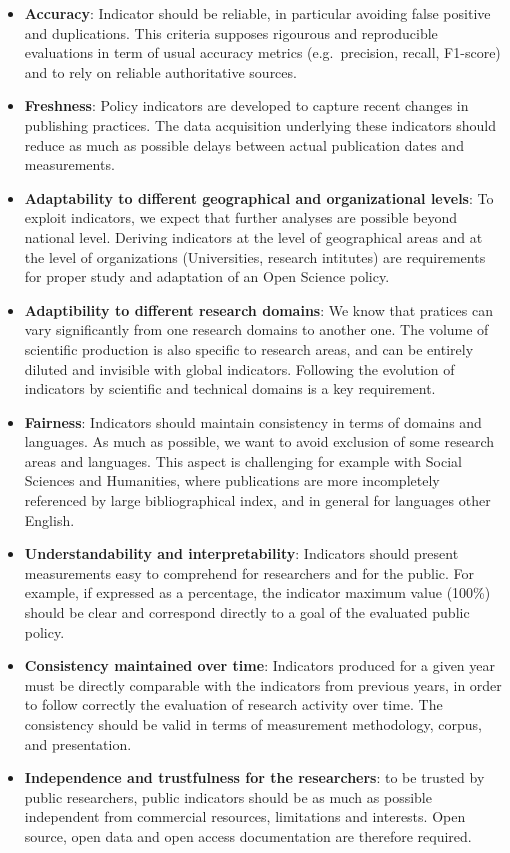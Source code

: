 \documentclass[
]{article}
\begin{document}
\begin{itemize}
\item
  \textbf{Accuracy}: Indicator should be reliable, in particular
  avoiding false positive and duplications. This criteria supposes
  rigourous and reproducible evaluations in term of usual accuracy
  metrics (e.g.~precision, recall, F1-score) and to rely on reliable
  authoritative sources.
\item
  \textbf{Freshness}: Policy indicators are developed to capture recent
  changes in publishing practices. The data acquisition underlying these
  indicators should reduce as much as possible delays between actual
  publication dates and measurements.
\item
  \textbf{Adaptability to different geographical and organizational
  levels}: To exploit indicators, we expect that further analyses are
  possible beyond national level. Deriving indicators at the level of
  geographical areas and at the level of organizations (Universities,
  research intitutes) are requirements for proper study and adaptation
  of an Open Science policy.
\item
  \textbf{Adaptibility to different research domains}: We know that
  pratices can vary significantly from one research domains to another
  one. The volume of scientific production is also specific to research
  areas, and can be entirely diluted and invisible with global
  indicators. Following the evolution of indicators by scientific and
  technical domains is a key requirement.
\item
  \textbf{Fairness}: Indicators should maintain consistency in terms of
  domains and languages. As much as possible, we want to avoid exclusion
  of some research areas and languages. This aspect is challenging for
  example with Social Sciences and Humanities, where publications are
  more incompletely referenced by large bibliographical index, and in
  general for languages other English.
\item
  \textbf{Understandability and interpretability}: Indicators should
  present measurements easy to comprehend for researchers and for the
  public. For example, if expressed as a percentage, the indicator
  maximum value (100\%) should be clear and correspond directly to a
  goal of the evaluated public policy.
\item
  \textbf{Consistency maintained over time}: Indicators produced for a
  given year must be directly comparable with the indicators from
  previous years, in order to follow correctly the evaluation of
  research activity over time. The consistency should be valid in terms
  of measurement methodology, corpus, and presentation.
\item
  \textbf{Independence and trustfulness for the researchers}: to be
  trusted by public researchers, public indicators should be as much as
  possible independent from commercial resources, limitations and
  interests. Open source, open data and open access documentation are
  therefore required.
\end{itemize}
\end{document}
